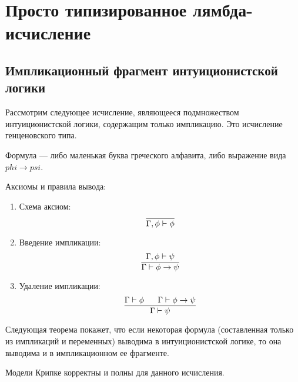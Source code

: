 \section{Просто типизированное лямбда-исчисление}

\subsection{Импликационный фрагмент интуиционистской логики}

Рассмотрим следующее исчисление, являющееся подмножеством интуиционистской
логики, содержащим только импликацию. Это исчисление генценовского типа.

Формула --- либо маленькая буква греческого алфавита, либо выражение вида
$phi \rightarrow psi$.

Аксиомы и правила вывода:

\begin{enumerate}
\item Схема аксиом:
$$\infer{\Gamma, \phi \vdash \phi}{}$$
\item Введение импликации:
$$\infer{\Gamma \vdash \phi \rightarrow \psi}{\Gamma, \phi \vdash \psi}$$
\item Удаление импликации:
$$\infer{\Gamma \vdash \psi}{\Gamma\vdash\phi~~~~~\Gamma\vdash\phi\rightarrow\psi}$$
\end{enumerate}

Следующая теорема покажет, что если некоторая формула (составленная только из
импликаций и переменных) выводима в интуиционистской логике, то она выводима
и в импликационном ее фрагменте.

\begin{theorem}
Модели Крипке корректны и полны для данного исчисления.
\end{theorem}


